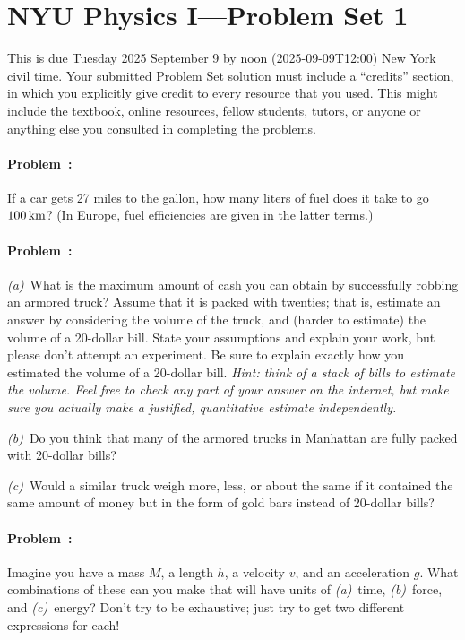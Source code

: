 \documentclass[12pt]{article}
\begin{document}
\section*{NYU Physics I---Problem Set 1}

This is due Tuesday 2025 September 9 by noon (2025-09-09T12:00) New York civil time.
Your submitted Problem Set solution must include a ``credits''
section, in which you explicitly give credit to every resource that
you used.  This might include the textbook, online resources, fellow
students, tutors, or anyone or anything else you consulted in completing the
problems.

\paragraph{Problem~\theproblem:}%
If a car gets 27 miles to the gallon, how many liters of fuel does it
take to go $100\,\mathrm{km}$? (In Europe, fuel efficiencies are given in the
latter terms.)

\paragraph{Problem~\theproblem:}%
\textsl{(a)}~What is the maximum amount of cash you can obtain by
successfully robbing an armored truck?  Assume that it is packed with
twenties; that is, estimate an answer by considering the volume of the
truck, and (harder to estimate) the volume of a 20-dollar bill.  State
your assumptions and explain your work, but please don't attempt an
experiment.  Be sure to explain exactly how you estimated the volume
of a 20-dollar bill.  \emph{Hint: think of a stack of bills to
  estimate the volume.  Feel free to \emph{check} any part of your
  answer on the internet, but make sure you actually make a justified,
  quantitative estimate independently.}

\textsl{(b)}~Do you think that many of the armored trucks in Manhattan
are fully packed with 20-dollar bills?

\textsl{(c)}~Would a similar truck weigh more, less, or about the same
if it contained the same amount of money but in the form of gold bars
instead of 20-dollar bills?

\paragraph{Problem~\theproblem:}%
Imagine you have a mass $M$, a length $h$, a velocity $v$, and an
acceleration $g$. What combinations of these can you make that will
have units of
\textsl{(a)}~time,
\textsl{(b)}~force, and
\textsl{(c)}~energy?
Don't try to be exhaustive; just try to get two different expressions
for each!
\end{document}
